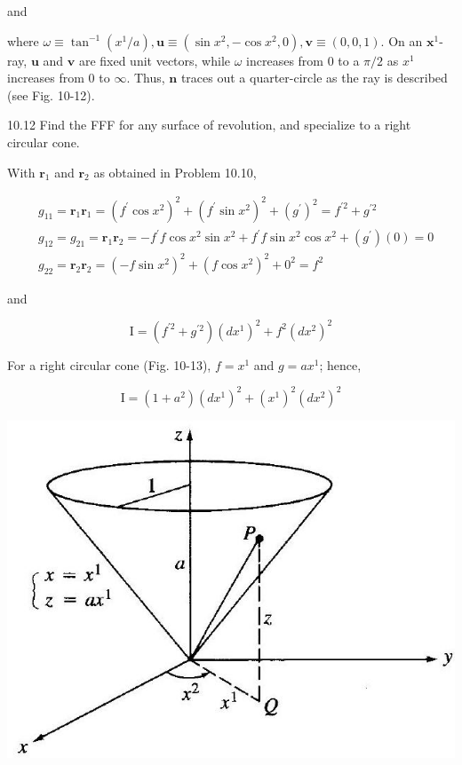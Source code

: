 \documentclass[10pt]{article}
\begin{document}
and

where $\omega \equiv \tan ^{-1}\left(x^{1} / a\right), \mathbf{u} \equiv\left(\sin x^{2},-\cos x^{2}, 0\right), \mathbf{v} \equiv(0,0,1)$. On an $\mathbf{x}^{1}$-ray, $\mathbf{u}$ and $\mathbf{v}$ are fixed unit vectors, while $\omega$ increases from 0 to a $\pi / 2$ as $x^{1}$ increases from 0 to $\infty$. Thus, $\mathbf{n}$ traces out a quarter-circle as the ray is described (see Fig. 10-12).

10.12 Find the FFF for any surface of revolution, and specialize to a right circular cone.

With $\mathbf{r}_{1}$ and $\mathbf{r}_{2}$ as obtained in Problem 10.10,

$$
\begin{aligned}
& g_{11}=\mathbf{r}_{1} \mathbf{r}_{1}=\left(f^{\prime} \cos x^{2}\right)^{2}+\left(f^{\prime} \sin x^{2}\right)^{2}+\left(g^{\prime}\right)^{2}=f^{\prime 2}+g^{\prime 2} \\
& g_{12}=g_{21}=\mathbf{r}_{1} \mathbf{r}_{2}=-f^{\prime} f \cos x^{2} \sin x^{2}+f^{\prime} f \sin x^{2} \cos x^{2}+\left(g^{\prime}\right)(0)=0 \\
& g_{22}=\mathbf{r}_{2} \mathbf{r}_{2}=\left(-f \sin x^{2}\right)^{2}+\left(f \cos x^{2}\right)^{2}+0^{2}=f^{2}
\end{aligned}
$$

and


\begin{equation*}
\mathrm{I}=\left(f^{\prime 2}+g^{\prime 2}\right)\left(d x^{1}\right)^{2}+f^{2}\left(d x^{2}\right)^{2} \tag{1}
\end{equation*}


For a right circular cone (Fig. 10-13), $f=x^{1}$ and $g=a x^{1}$; hence,


\begin{equation*}
\mathrm{I}=\left(1+a^{2}\right)\left(d x^{1}\right)^{2}+\left(x^{1}\right)^{2}\left(d x^{2}\right)^{2} \tag{2}
\end{equation*}


\begin{center}
\includegraphics[max width=\textwidth]{2024_04_03_41f90be4f896e21f0dc9g-154}
\end{center}
\end{document}
